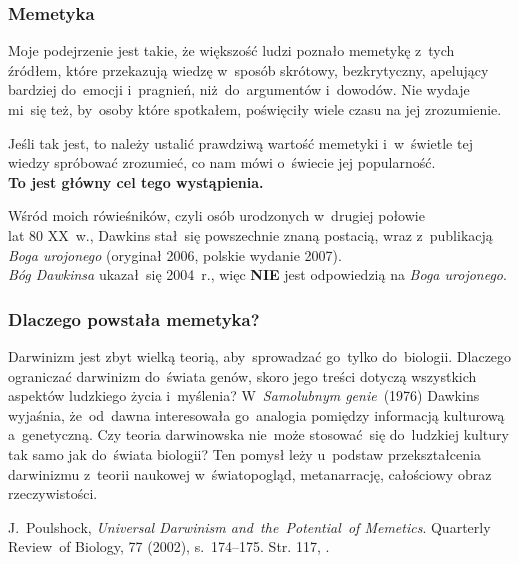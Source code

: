 \documentclass[10pt,t]{beamer}
\begin{document}
\begin{frame}
  \frametitle{Memetyka}


  Moje podejrzenie jest takie, że większość ludzi poznało
  memetykę z~tych źródłem, które przekazują wiedzę w~sposób skrótowy,
  bezkrytyczny, apelujący bardziej do~emocji i~pragnień, niż~do~argumentów
  i~dowodów. Nie wydaje mi~się też, by~osoby które spotkałem, poświęciły
  wiele czasu na jej zrozumienie.


  Jeśli tak jest, to należy ustalić prawdziwą wartość memetyki i~w~świetle
  tej wiedzy spróbować zrozumieć, co nam mówi o~świecie jej popularność. \\
  \textbf{To jest główny cel tego wystąpienia.}

  Wśród moich rówieśników, czyli osób urodzonych w~drugiej połowie \\
  lat 80 XX~w., Dawkins stał~się powszechnie znaną postacią, wraz
  z~publikacją \textit{Boga urojonego} (oryginał 2006, polskie wydanie
  2007). \\
  \textit{Bóg Dawkinsa} ukazał~się 2004~r., więc \textbf{NIE} jest
  odpowiedzią na \textit{Boga urojonego}.

\end{frame}





\begin{frame}
  \frametitle{Dlaczego powstała memetyka?}


  Darwinizm jest zbyt wielką teorią, aby~sprowadzać
  go~tylko do~biologii. Dlaczego ograniczać darwinizm do~świata
  genów, skoro jego treści dotyczą wszystkich aspektów ludzkiego
  życia i~myślenia? W~\textit{Samolubnym genie}~(1976) Dawkins
  wyjaśnia, że~od~dawna interesowała go~analogia pomiędzy informacją
  kulturową a~genetyczną. Czy teoria darwinowska nie~może
  stosować~się do~ludzkiej kultury tak samo jak do~świata biologii?
  Ten pomysł leży u~podstaw przekształcenia darwinizmu z~teorii
  naukowej w~światopogląd, metanarrację, całościowy obraz
  rzeczywistości.

  J.~Poulshock, \textit{Universal Darwinism
    and~the~Potential~of Memetics}. Quarterly Review~of Biology,
  77 (2002), s.~174--175. Str. 117, \cite{McGrathBogDawkinsa2008}.

\end{frame}
\end{document}
